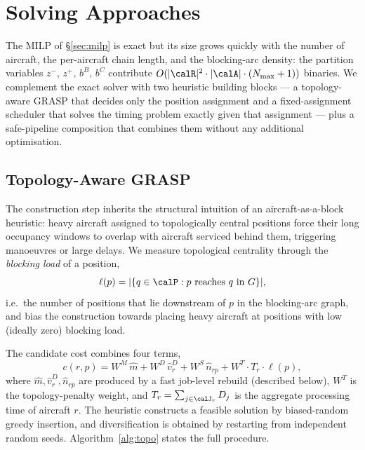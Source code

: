 \section{Solving Approaches}
\label{sec:approaches}

The MILP of \S\ref{sec:milp} is exact but its size grows quickly with the
number of aircraft, the per-aircraft chain length, and the blocking-arc
density: the partition variables $z^-,\,z^+,\,b^B,\,b^C$ contribute
$O(|\calR|^2 \cdot |\calA| \cdot (N_{\max} + 1))$ binaries.  We
complement the exact solver with two heuristic building blocks --- a
topology-aware GRASP that decides only the position assignment and a
fixed-assignment scheduler that solves the timing problem exactly given
that assignment --- plus a safe-pipeline composition that combines them
without any additional optimisation.

\subsection{Topology-Aware GRASP}
\label{sec:topo_heuristic}

The construction step inherits the structural intuition of an
aircraft-as-a-block heuristic: heavy aircraft assigned to topologically
central positions force their long occupancy windows to overlap with
aircraft serviced behind them, triggering manoeuvres or large delays.
We measure topological centrality through the \emph{blocking load} of a
position,
\[
  \ell(p) = |\{q \in \calP : p \text{ reaches } q \text{ in } G\}|,
\]
i.e.\ the number of positions that lie downstream of $p$ in the
blocking-arc graph, and bias the construction towards placing heavy
aircraft at positions with low (ideally zero) blocking load.

The candidate cost combines four terms,
\[
  c(r, p) = W^M\,\hat m + W^D\,\hat v^D_r + W^S\,\hat n_{rp}
            + W^T \cdot T_r \cdot \ell(p),
\]
where $\hat m, \hat v^D_r, \hat n_{rp}$ are produced by a fast
job-level rebuild (described below), $W^T$ is the topology-penalty
weight, and $T_r = \sum_{j \in \calJ_r} D_j$ is the aggregate
processing time of aircraft $r$.  The heuristic constructs a feasible
solution by biased-random greedy insertion, and diversification is
obtained by restarting from independent random seeds.
Algorithm~\ref{alg:topo} states the full procedure.


